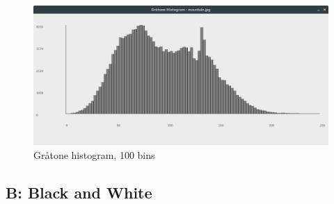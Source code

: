 \documentclass[a4paper,10pt]{article}
\begin{document}
\begin{figure}[H]
	\centering
    	\includegraphics[width=\textwidth]{hist2.png}
    	\caption{Gråtone histogram, 100 bins}
\end{figure}


\subsection*{B: Black and White}
\end{document}
